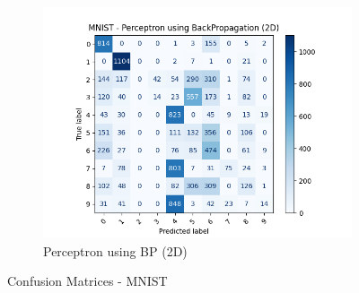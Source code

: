 \begin{figure}[htbp]
                \begin{subfigure}[b]{0.33\linewidth}
                    \centering
                    \includegraphics[width=1\linewidth]{../source/mnist/pictures/perceptronBP-confusion-2d.png}
                    \caption{Perceptron using BP (2D)}
                    \label{fig:mnist-confusion-pbp-2}
                \end{subfigure}
        \caption{Confusion Matrices - MNIST}
        \label{fig:mnist-confusion}
\end{figure}

